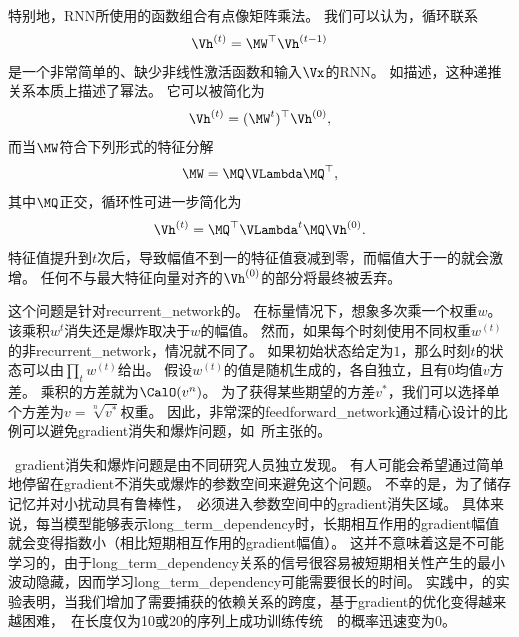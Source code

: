 特别地，\gls{RNN}所使用的函数组合有点像矩阵乘法。
我们可以认为，循环联系
\begin{align}
 \Vh^{(t)} = \MW^\top \Vh^{(t-1)}
\end{align}
是一个非常简单的、缺少非线性激活函数和输入$\Vx$的\gls{RNN}。
如描述，这种递推关系本质上描述了幂法。
它可以被简化为
\begin{align}
 \Vh^{(t)} = (\MW^t)^\top \Vh^{(0)},
\end{align}
而当$\MW$符合下列形式的特征分解
\begin{align}
 \MW = \MQ \VLambda \MQ^\top,
\end{align}
其中$\MQ$正交，循环性可进一步简化为
\begin{align}
 \Vh^{(t)} = \MQ^\top \VLambda^t \MQ \Vh^{(0)}.
\end{align}
特征值提升到$t$次后，导致幅值不到一的特征值衰减到零，而幅值大于一的就会激增。
任何不与最大特征向量对齐的$\Vh^{(0)}$的部分将最终被丢弃。


这个问题是针对\gls{recurrent_network}的。
在标量情况下，想象多次乘一个权重$w$。
该乘积$w^t$消失还是爆炸取决于$w$的幅值。
然而，如果每个时刻使用不同权重$w^{(t)}$的非\gls{recurrent_network}，情况就不同了。
如果初始状态给定为$1$，那么时刻$t$的状态可以由$\prod_t w^{(t)}$给出。
假设$w^{(t)}$的值是随机生成的，各自独立，且有$0$均值$v$方差。
乘积的方差就为$\CalO(v^n)$。
为了获得某些期望的方差$v^*$，我们可以选择单个方差为$v=\sqrt[n]{v^*}$权重。
因此，非常深的\gls{feedforward_network}通过精心设计的比例可以避免\gls{gradient}消失和爆炸问题，如~\cite{Sussillo-2014}所主张的。


~\gls{gradient}消失和爆炸问题是由不同研究人员独立发现\citep{Hochreiter-1991,Bengio-et-al-1993,Bengio-et-al-1994}。
有人可能会希望通过简单地停留在\gls{gradient}不消失或爆炸的参数空间来避免这个问题。
不幸的是，为了储存记忆并对小扰动具有鲁棒性，~必须进入参数空间中的\gls{gradient}消失区域\citep{Bengio-et-al-1993,Bengio-et-al-1994}。
具体来说，每当模型能够表示\gls{long_term_dependency}时，长期相互作用的\gls{gradient}幅值就会变得指数小（相比短期相互作用的\gls{gradient}幅值）。
这并不意味着这是不可能学习的，由于\gls{long_term_dependency}关系的信号很容易被短期相关性产生的最小波动隐藏，因而学习\gls{long_term_dependency}可能需要很长的时间。
实践中，\cite{Bengio-et-al-1994}的实验表明，当我们增加了需要捕获的依赖关系的跨度，基于\gls{gradient}的优化变得越来越困难，~在长度仅为10或20的序列上成功训练传统~~的概率迅速变为0。

